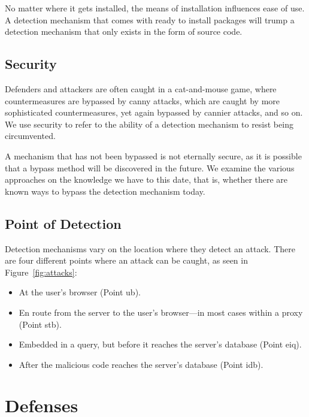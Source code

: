 \documentclass[conference]{IEEEtran}
\begin{document}
No matter where it gets installed, the means of installation influences
ease of use. A detection mechanism that comes with ready to install
packages will trump a detection mechanism that only exists in the form
of source code. 

\subsection{Security}

Defenders and attackers are often caught in a cat-and-mouse game,
where countermeasures are bypassed by canny attacks, which are caught
by more sophisticated countermeasures, yet again bypassed by cannier
attacks, and so on. We use security to refer to the ability of a
detection mechanism to resist being circumvented. 

A mechanism that has not been bypassed is not eternally secure, as it
is possible that a bypass method will be discovered in the future. We
examine the various approaches on the knowledge we have to this date,
that is, whether there are known ways to bypass the detection
mechanism today.

\subsection{Point of Detection}

Detection mechanisms vary on the location where they detect an attack.
There are four different points where an attack can be caught, as seen
in Figure~\ref{fig:attacks}:
\begin{itemize}
\item At the user's browser (Point {\sc ub}).
\item En route from the server to the user's browser---in most cases
within a proxy (Point {\sc s}t{\sc b}).
\item Embedded in a query, but before it reaches the server's database
  (Point {\sc e}i{\sc q}).
\item After the malicious code reaches the server's database
  (Point i{\sc db}).
\end{itemize}

\section{Defenses}
\label{sec:defs}
\end{document}
